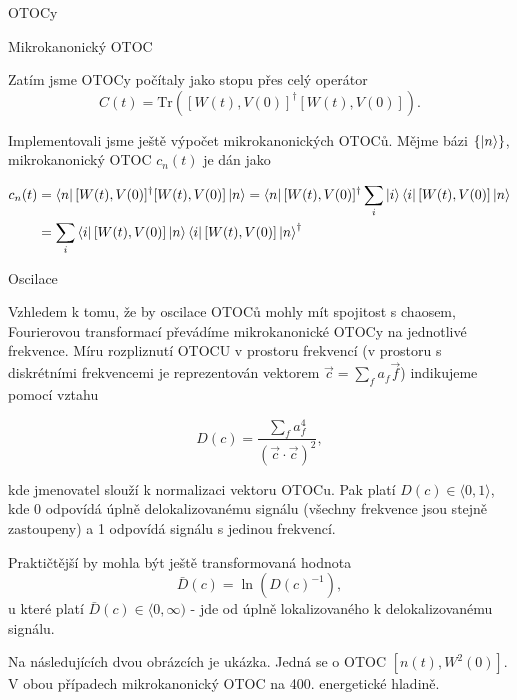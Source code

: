 \documentclass{article}
\begin{document}
\begin{section}{OTOCy}
    \begin{subsection}{Mikrokanonický OTOC}

    Zatím jsme OTOCy počítaly jako stopu přes celý operátor 
    $$ C(t) = \text{Tr}([W(t),V(0)]^{\dagger}[W(t),V(0)]).$$

    Implementovali jsme ještě výpočet mikrokanonických OTOCů. Mějme bázi
    $\{ \ket{n} \}$, mikrokanonický OTOC $c_n(t)$ je dán jako

    \begin{align*}c_n(t) &= \bra{n} [W(t),V(0)]^{\dagger}[W(t),V(0)] \ket{n} =
    \bra{n} [W(t),V(0)]^{\dagger} \sum_i \ket{i}\bra{i} [W(t),V(0)] \ket{n} \\
    &=\sum_i \bra{i} [W(t),V(0)] \ket{n} \bra{i} [W(t),V(0)] \ket{n}^{\dagger}
    \end{align*}


    \end{subsection}

    \begin{subsection}{Oscilace}

        Vzhledem k tomu, že by oscilace OTOCů mohly mít spojitost s chaosem, Fourierovou transformací převádíme
        mikrokanonické OTOCy na jednotlivé frekvence. Míru rozpliznutí OTOCU v prostoru frekvencí (v prostoru s diskrétními frekvencemi
        je reprezentován vektorem $\vec{c} = \sum_f a_f \vec{f}$) indikujeme 
        pomocí vztahu

        $$D(c) = \frac{\sum_f a_f^4}{(\vec{c}\cdot\vec{c})^2},$$

        kde jmenovatel slouží k normalizaci vektoru OTOCu. Pak platí $D(c) \in \langle 0, 1\rangle$, kde 
        0 odpovídá úplně delokalizovanému signálu (všechny frekvence jsou stejně zastoupeny) a 1 odpovídá signálu
        s jedinou frekvencí.

        Praktičtější by mohla být ještě transformovaná hodnota 
        $$\bar{D}(c) = \ln (D(c)^{-1}),$$
        u které platí $\bar{D}(c) \in \langle 0, \infty )$ - jde od úplně lokalizovaného k delokalizovanému signálu.

        Na následujících dvou obrázcích je ukázka. Jedná se o OTOC $[n(t),W^2(0)]$. V obou případech mikrokanonický OTOC 
        na 400. energetické hladině. 
    \end{subsection}


\end{section}
\end{document}
